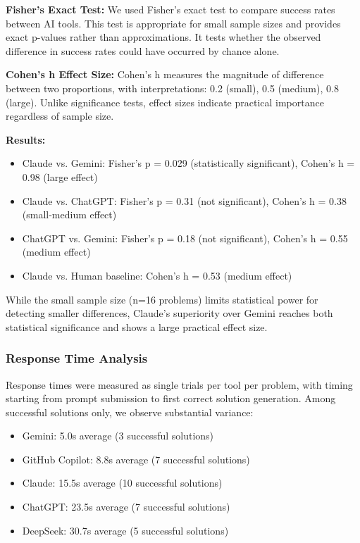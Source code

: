 \documentclass[conference]{IEEEtran}
\begin{document}
\textbf{Fisher's Exact Test:} We used Fisher's exact test to compare success rates between AI tools. This test is appropriate for small sample sizes and provides exact p-values rather than approximations. It tests whether the observed difference in success rates could have occurred by chance alone.

\textbf{Cohen's h Effect Size:} Cohen's h measures the magnitude of difference between two proportions, with interpretations: 0.2 (small), 0.5 (medium), 0.8 (large). Unlike significance tests, effect sizes indicate practical importance regardless of sample size.

\textbf{Results:}
\begin{itemize}
    \item Claude vs. Gemini: Fisher's p = 0.029 (statistically significant), Cohen's h = 0.98 (large effect)
    \item Claude vs. ChatGPT: Fisher's p = 0.31 (not significant), Cohen's h = 0.38 (small-medium effect)
    \item ChatGPT vs. Gemini: Fisher's p = 0.18 (not significant), Cohen's h = 0.55 (medium effect)
    \item Claude vs. Human baseline: Cohen's h = 0.53 (medium effect)
\end{itemize}

While the small sample size (n=16 problems) limits statistical power for detecting smaller differences, Claude's superiority over Gemini reaches both statistical significance and shows a large practical effect size.

\subsubsection{Response Time Analysis}

Response times were measured as single trials per tool per problem, with timing starting from prompt submission to first correct solution generation. Among successful solutions only, we observe substantial variance:

\begin{itemize}
    \item Gemini: 5.0s average (3 successful solutions)
    \item GitHub Copilot: 8.8s average (7 successful solutions) 
    \item Claude: 15.5s average (10 successful solutions)
    \item ChatGPT: 23.5s average (7 successful solutions)
    \item DeepSeek: 30.7s average (5 successful solutions)
\end{itemize}
\end{document}
